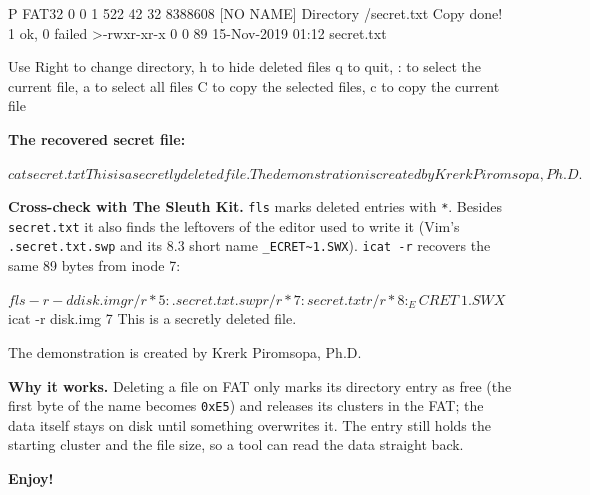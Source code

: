 \documentclass[a4paper, 10pt]{article}
\begin{document}
\begin{solution}
	\myspace

	\begin{codingbox*}[numbers=none, xleftmargin=0pt, belowskip=6pt, basicstyle=\ttfamily\footnotesize\color{editortext}]
   P FAT32                    0   0  1   522  42 32    8388608 [NO NAME]
Directory /secret.txt
Copy done! 1 ok, 0 failed
>-rwxr-xr-x     0     0        89 15-Nov-2019 01:12 secret.txt

Use Right to change directory, h to hide deleted files
    q to quit, : to select the current file, a to select all files
    C to copy the selected files, c to copy the current file
\end{codingbox*}


	\noindent \textbf{The recovered secret file:}

	\myspace

	\begin{codingbox*}[numbers=none, xleftmargin=0pt, belowskip=6pt, basicstyle=\ttfamily\footnotesize\color{editortext}]
$ cat secret.txt
This is a secretly deleted file.

The demonstration is created by Krerk Piromsopa, Ph.D.
$ 
\end{codingbox*}


	\myspace

	\noindent \textbf{Cross-check with The Sleuth Kit.} \texttt{fls} marks deleted entries with
	\texttt{*}. Besides \texttt{secret.txt} it also finds the leftovers of the editor used to write
	it (Vim's \texttt{.secret.txt.swp} and its 8.3 short name \texttt{\_ECRET\textasciitilde1.SWX}).
	\texttt{icat -r} recovers the same 89 bytes from inode 7:

	\myspace

	\begin{codingbox*}[numbers=none, xleftmargin=0pt, belowskip=6pt, basicstyle=\ttfamily\footnotesize\color{editortext}]
$ fls -r -d disk.img
r/r * 5:	.secret.txt.swp
r/r * 7:	secret.txt
r/r * 8:	_ECRET~1.SWX
$ icat -r disk.img 7
This is a secretly deleted file.

The demonstration is created by Krerk Piromsopa, Ph.D.
\end{codingbox*}

	\noindent \textbf{Why it works.} Deleting a file on FAT only marks its directory entry as free
	(the first byte of the name becomes \texttt{0xE5}) and releases its clusters in the FAT; the
	data itself stays on disk until something overwrites it. The entry still holds the starting
	cluster and the file size, so a tool can read the data straight back.
\end{solution}

\myspace

\begin{center}
	{ \LARGE \textbf{Enjoy!} }
\end{center}
\end{document}
